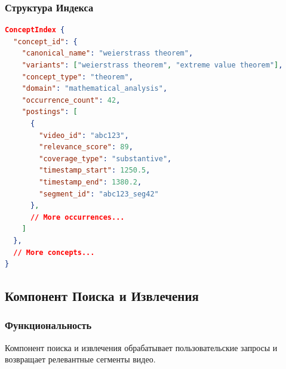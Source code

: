 \documentclass[12pt,a4paper]{article}
\begin{document}
\subsubsection{Структура Индекса}
\begin{lstlisting}[language=json, caption=Структура инвертированного индекса]
ConceptIndex {
  "concept_id": {
    "canonical_name": "weierstrass theorem",
    "variants": ["weierstrass theorem", "extreme value theorem"],
    "concept_type": "theorem",
    "domain": "mathematical_analysis",
    "occurrence_count": 42,
    "postings": [
      {
        "video_id": "abc123",
        "relevance_score": 89,
        "coverage_type": "substantive",
        "timestamp_start": 1250.5,
        "timestamp_end": 1380.2,
        "segment_id": "abc123_seg42"
      },
      // More occurrences...
    ]
  },
  // More concepts...
}
\end{lstlisting}

\subsection{Компонент Поиска и Извлечения}

\subsubsection{Функциональность}
Компонент поиска и извлечения обрабатывает пользовательские запросы и возвращает релевантные сегменты видео.
\end{document}
